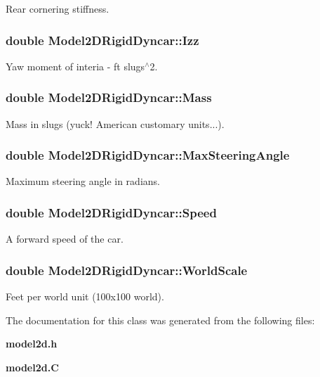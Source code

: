 Rear cornering stiffness.

\subsubsection{\setlength{\rightskip}{0pt plus 5cm}double Model2DRigid\-Dyncar::Izz}\label{classModel2DRigidDyncar_m5}


Yaw moment of interia - ft slugs$^\wedge$2.

\subsubsection{\setlength{\rightskip}{0pt plus 5cm}double Model2DRigid\-Dyncar::Mass}\label{classModel2DRigidDyncar_m0}


Mass in slugs (yuck! American customary units...).

\subsubsection{\setlength{\rightskip}{0pt plus 5cm}double Model2DRigid\-Dyncar::Max\-Steering\-Angle}\label{classModel2DRigidDyncar_m7}


Maximum steering angle in radians.

\subsubsection{\setlength{\rightskip}{0pt plus 5cm}double Model2DRigid\-Dyncar::Speed}\label{classModel2DRigidDyncar_m8}


A forward speed of the car.

\subsubsection{\setlength{\rightskip}{0pt plus 5cm}double Model2DRigid\-Dyncar::World\-Scale}\label{classModel2DRigidDyncar_m6}


Feet per world unit (100x100 world).



The documentation for this class was generated from the following files:\begin{CompactItemize}
\item 
{\bf model2d.h}\item 
{\bf model2d.C}\end{CompactItemize}
